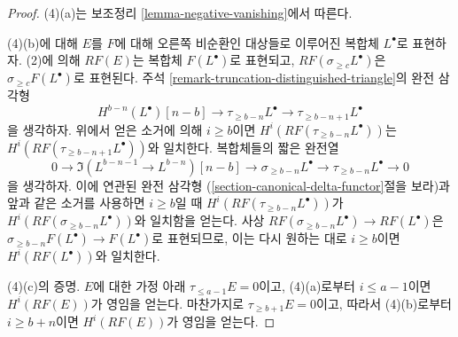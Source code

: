 \begin{proof}
\medskip\noindent
(4)(a)는 보조정리 \ref{lemma-negative-vanishing}에서 따른다.

\medskip\noindent
(4)(b)에 대해 $E$를 $F$에 대해 오른쪽 비순환인 대상들로 이루어진
복합체 $L^\bullet$로 표현하자. (2)에 의해 $RF(E)$는 복합체
$F(L^\bullet)$로 표현되고, $RF(\sigma_{\geq c}L^\bullet)$은
$\sigma_{\geq c}F(L^\bullet)$로 표현된다. 주석
\ref{remark-truncation-distinguished-triangle}의 완전 삼각형
$$
H^{b - n}(L^\bullet)[n - b] \to
\tau_{\geq b - n}L^\bullet \to
\tau_{\geq b - n + 1}L^\bullet
$$
을 생각하자. 위에서 얻은 소거에 의해 $i \geq b$이면
$H^i(RF(\tau_{\geq b - n}L^\bullet))$는
$H^i(RF(\tau_{\geq b - n + 1}L^\bullet))$와 일치한다.
복합체들의 짧은 완전열
$$
0 \to
\Im(L^{b - n - 1} \to L^{b - n})[n - b] \to
\sigma_{\geq b - n}L^\bullet \to
\tau_{\geq b - n}L^\bullet \to 0
$$
을 생각하자. 이에 연관된 완전 삼각형
(\ref{section-canonical-delta-functor}절을 보라)과 앞과 같은 소거를
사용하면 $i \geq b$일 때
$H^i(RF(\tau_{\geq b - n}L^\bullet))$가
$H^i(RF(\sigma_{\geq b - n}L^\bullet))$와 일치함을 얻는다.
사상 $RF(\sigma_{\geq b - n}L^\bullet) \to RF(L^\bullet)$은
$\sigma_{\geq b - n}F(L^\bullet) \to F(L^\bullet)$로 표현되므로,
이는 다시 원하는 대로 $i \geq b$이면
$H^i(RF(L^\bullet))$와 일치한다.

\medskip\noindent
(4)(c)의 증명. $E$에 대한 가정 아래 $\tau_{\leq a - 1}E = 0$이고,
(4)(a)로부터 $i \leq a - 1$이면 $H^i(RF(E))$가 영임을 얻는다.
마찬가지로 $\tau_{\geq b + 1}E = 0$이고, 따라서 (4)(b)로부터
$i \geq b + n$이면 $H^i(RF(E))$가 영임을 얻는다.
\end{proof}

